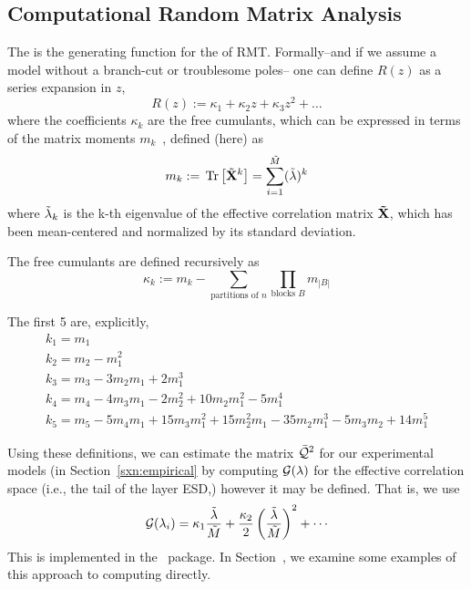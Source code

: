 \subsection{Computational Random Matrix Analysis}
\label{sxn:comp_rmt}
The \RTransform is the generating function for the \emph{\FreeCumulants} of RMT.
Formally--and if we assume a model without a branch-cut or troublesome poles--
one can define $R(z)$ as a series expansion in $z$,
\begin{equation}
  \label{eqn:Rz_expansion}
  R(z) := \kappa_1 + \kappa_2 z + \kappa_3 z^2 + \ldots 
\end{equation}
where the coefficients $\kappa_{k}$ are the free cumulants, which can be expressed
in terms of the matrix moments $m_{k}$~\cite{potters_bouchaud_2020}, defined (here) as
\begin{equation}
  \label{eqn:mk_defn}
  m_{k}:=\mbox{}\operatorname{Tr}\left[\tilde{\mathbf{X}}^{k}\right]=\sum_{i=1}^{\tilde{M}}(\tilde{\lambda})^{k}
\end{equation}
where $\tilde{\lambda}_{k}$ is the k-th eigenvalue of the effective correlation matrix $\mathbf{\tilde{\mathbf{X}}}$,
which has been mean-centered and normalized by its standard deviation.

The free cumulants are defined recursively as
\begin{equation}
  \label{eqn:kappa_defn}
  \kappa_k := m_k - \sum_{\text{partitions of } n} \prod_{\text{blocks } B} m_{|B|} 
\end{equation}

The first 5 \emph{\Cumulants} are, explicitly,
\begin{align}
  \label{eqn:kappa_defn_2}
  k_1 = m_1 \\ \nonumber
  k_2 = m_2 - m_1^2 \\ \nonumber
  k_3 = m_3 - 3 m_2 m_1 + 2 m_1^3 \\ \nonumber
  k_4 = m_4 - 4 m_3 m_1 - 2 m_2^2 + 10 m_2 m_1^2 - 5 m_1^4 \\ \nonumber 
  k_5 = m_5 - 5 m_4 m_1 + 15 m_3 m_1^2 + 15 m_2^2 m_1 - 35 m_2 m_1^3 - 5 m_3 m_2 + 14 m_1^5
\end{align}

Using these definitions, we can estimate the \LayerQuality matrix $\bar{\mathcal{Q}}^{2}$ for our experimental models
(in Section~\ref{sxn:empirical} by computing $\mathcal{G(\lambda)}$ for the effective correlation space
(i.e., the tail of the layer ESD,) however it may be defined. That is, we use
\begin{align}
  \label{eqn:G_lambda_series}
\mathcal{G}(\lambda_{i})=\kappa_{1}\frac{\tilde{\lambda}}{\tilde{M}}+\frac{\kappa_{2}}{2}\left(\dfrac{\tilde{\lambda}}{\tilde{M}}\right)^{2}+\cdots
\end{align}
This is implemented in the ~\WW package.
In Section~, we examine some examples of this approach to computing \LayerQualities directly.

